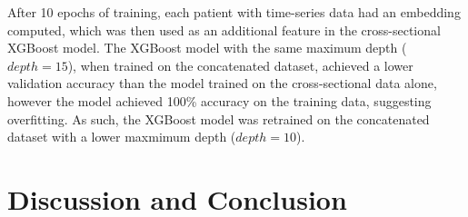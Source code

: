 \documentclass[12pt]{extarticle}
\begin{document}
      After 10 epochs of training, each patient with time-series data had an embedding computed, which was then used as an additional feature in the cross-sectional XGBoost model.
      The XGBoost model with the same maximum depth ($depth=15$), when trained on the concatenated dataset, achieved a lower validation accuracy than the model trained on the cross-sectional data alone, however the model achieved 100\% accuracy on the training data, suggesting overfitting.
      As such, the XGBoost model was retrained on the concatenated dataset with a lower maxmimum depth ($depth=10$).


\section{Discussion and Conclusion}

\pagebreak
\nocite{*}



\pagebreak


\end{document}
